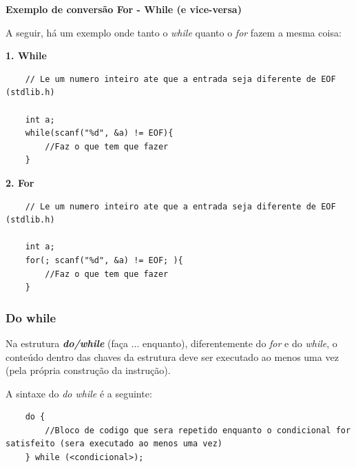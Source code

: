 \documentclass[12pt]{article}
\newcommand\tab[1][1cm]{\hspace*{#1}}
\begin{document}
\hspace{0.25cm}
\par\tab\textbf{Exemplo de conversão For - While (e vice-versa)}

\par\tab A seguir, há um exemplo onde tanto o \textit{while} quanto o \textit{for} fazem a mesma coisa:

\hspace{0.25cm}

\par\tab\textbf{1. While}

\hspace{0.25cm}
\begin{lstlisting}
    // Le um numero inteiro ate que a entrada seja diferente de EOF (stdlib.h)
    
    int a;
    while(scanf("%d", &a) != EOF){
        //Faz o que tem que fazer
    }
\end{lstlisting}

\par\tab\textbf{2. For}

\hspace{0.25cm}
\begin{lstlisting}
    // Le um numero inteiro ate que a entrada seja diferente de EOF (stdlib.h)
    
    int a;
    for(; scanf("%d", &a) != EOF; ){
        //Faz o que tem que fazer
    }
\end{lstlisting}

\subsubsection{Do while}

\par\tab Na estrutura \textbf{\textit{do/while}} (faça ... enquanto), diferentemente do \textit{for} e do \textit{while}, o conteúdo dentro das chaves da estrutura deve ser executado ao menos uma vez (pela própria construção da instrução)\cite{site:do_while}.

\par\tab A sintaxe do \textit{do while} é a seguinte:

\hspace{0.25cm}
\begin{lstlisting}
    do {
        //Bloco de codigo que sera repetido enquanto o condicional for satisfeito (sera executado ao menos uma vez)
    } while (<condicional>);
\end{lstlisting}
\end{document}
